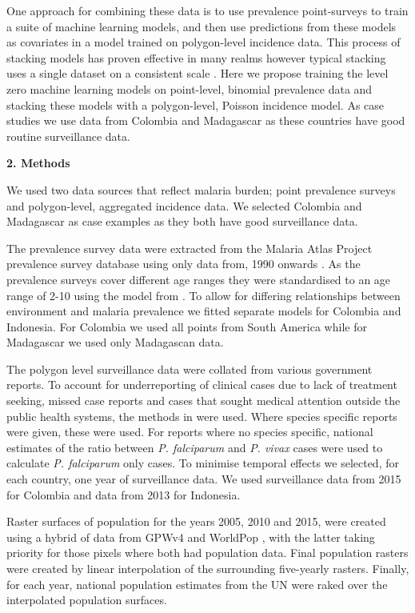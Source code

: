 \documentclass[11pt]{article}
\begin{document}
One approach for combining these data is to use prevalence point-surveys to train a suite of machine learning models, and then use predictions from these models as covariates in a model trained on polygon-level incidence data. 
This process of stacking models has proven effective in many realms however typical stacking uses a single dataset on a consistent scale \cite{Sill2009, bhatt2017improved}. 
Here we propose training the level zero machine learning models on point-level, binomial prevalence data and stacking these models with a polygon-level, Poisson incidence model. 
As case studies we use data from Colombia and Madagascar as these countries have  good routine surveillance data.


{\bf 2. Methods}

We used two data sources that reflect malaria burden; point prevalence surveys and polygon-level, aggregated incidence data. 
We selected Colombia and Madagascar as case examples as they  both have good surveillance data.

The prevalence survey data were extracted from the Malaria Atlas Project prevalence survey database using only data from, 1990 onwards \cite{bhatt2015effect}. 
As the prevalence surveys cover different age ranges they were standardised to an age range of 2-10 using the model from \cite{smith2007standardizing}. 
To allow for differing relationships between environment and malaria prevalence we fitted separate models for Colombia and Indonesia. 
For Colombia we used all points from South America while for Madagascar we used only Madagascan data.

The polygon level surveillance data were collated from various government reports. To account for underreporting of clinical cases due to lack of treatment seeking, missed case reports and cases that sought medical attention outside the public health systems, the methods in \cite{cibulskis2011worldwide} were used. Where species specific reports were given, these were used. For reports where no species specific, national estimates of the ratio between \emph{P. falciparum} and \emph{P. vivax} cases were used to calculate \emph{P. falciparum} only cases. To minimise temporal effects we selected, for each country, one year of surveillance data. 
We used surveillance data from 2015 for Colombia and data from 2013 for Indonesia.

Raster surfaces of population for the years 2005, 2010 and 2015, were created using a hybrid of data from GPWv4 \cite{gpw4} and WorldPop \cite{tatem2017worldpop}, with the latter taking priority for those pixels where both had population data. 
Final population rasters were created by linear interpolation of the surrounding five-yearly rasters. 
Finally, for each year, national population estimates from the UN were raked over the interpolated population surfaces. 
\end{document}
